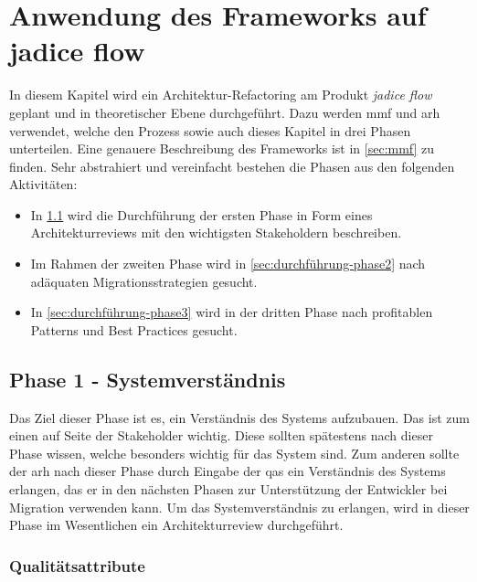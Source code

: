 \chapter{Anwendung des Frameworks auf jadice flow}
\label{chap:anwendung}

In diesem Kapitel wird ein Architektur-Refactoring am Produkt \emph{jadice flow} geplant und in theoretischer Ebene durchgeführt.
Dazu werden \acrfull{mmf} und \acrfull{arh} verwendet, welche den Prozess sowie auch dieses Kapitel in drei Phasen unterteilen.
Eine genauere Beschreibung des Frameworks ist in \cref{sec:mmf} zu finden.
Sehr abstrahiert und vereinfacht bestehen die Phasen aus den folgenden Aktivitäten:
\begin{itemize}
	\item In \cref{sec:durchführung-phase1} wird die Durchführung der ersten Phase in Form eines Architekturreviews mit den wichtigsten Stakeholdern beschreiben.
	\item Im Rahmen der zweiten Phase wird in \cref{sec:durchführung-phase2} nach adäquaten Migrationsstrategien gesucht.
	\item In \cref{sec:durchführung-phase3} wird in der dritten Phase nach profitablen Patterns und Best Practices gesucht.
\end{itemize}

\section{Phase 1 - Systemverständnis}
\label{sec:durchführung-phase1}

Das Ziel dieser Phase ist es, ein Verständnis des Systems aufzubauen.
Das ist zum einen auf Seite der Stakeholder wichtig.
Diese sollten spätestens nach dieser Phase wissen, welche  besonders wichtig für das System sind.
Zum anderen sollte der \gls{arh} nach dieser Phase durch Eingabe der \glspl{qa} ein Verständnis des Systems erlangen, das er in den nächsten Phasen zur Unterstützung der Entwickler bei Migration verwenden kann.
Um das Systemverständnis zu erlangen, wird in dieser Phase im Wesentlichen ein Architekturreview durchgeführt. 

\subsection{Qualitätsattribute}


